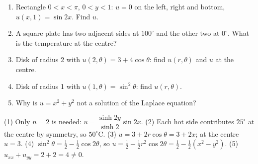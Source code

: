 \begin{practicebox}
\begin{enumerate}
  \item Rectangle $0<x<\pi$, $0<y<1$: $u=0$ on the left, right and bottom, $u(x,1)=\sin 2x$. Find $u$.
  \item A square plate has two adjacent sides at $100^\circ$ and the other two at $0^\circ$. What is the temperature at the centre?
  \item Disk of radius 2 with $u(2,\theta) = 3 + 4\cos\theta$: find $u(r,\theta)$ and $u$ at the centre.
  \item Disk of radius 1 with $u(1,\theta) = \sin^2\theta$: find $u(r,\theta)$.
  \item Why is $u = x^2+y^2$ not a solution of the Laplace equation?
\end{enumerate}
\end{practicebox}

\begin{answerbox}
(1) Only $n=2$ is needed: $u = \dfrac{\sinh 2y}{\sinh 2}\sin 2x$. \quad (2) Each hot side contributes $25^\circ$ at the centre by symmetry, so $50^\circ$C. \quad (3) $u = 3 + 2r\cos\theta = 3 + 2x$; at the centre $u = 3$. \quad (4) $\sin^2\theta = \frac12 - \frac12\cos 2\theta$, so $u = \frac12 - \frac12r^2\cos2\theta = \frac12 - \frac12(x^2-y^2)$. \quad (5) $u_{xx}+u_{yy} = 2+2 = 4\neq0$.
\end{answerbox}
